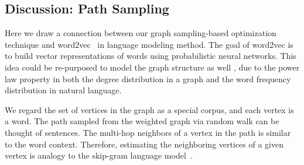 \subsection{Discussion: Path Sampling}

Here we draw a connection between our graph sampling-based optimization technique and  word2vec~\cite{mikolov2013efficient} in language modeling method. The goal of word2vec is to build vector representations of words using probabilistic neural networks. This idea could be re-purposed to model the graph structure as well \cite{perozzi2014deepwalk}, due to the power law property in both the degree distribution in a graph and the word frequency distribution in natural language.

We regard the set of vertices in the graph as a special corpus, and each vertex is a word. The path sampled from the weighted graph via random walk can be thought of sentences. The multi-hop neighbors of a vertex in the path is similar to the word context. Therefore, estimating the neighboring vertices of a given vertex is analogy to the skip-gram language model~\cite{grovernode2vec}. 